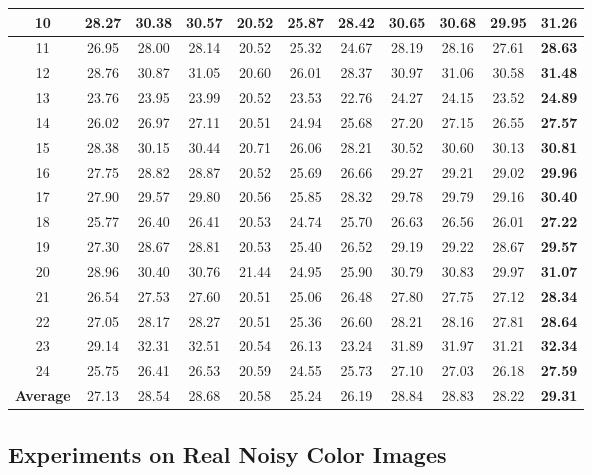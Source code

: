 \documentclass[10pt,twocolumn,letterpaper]{article}
\begin{document}
\begin{table}
\begin{center}
\begin{tabular}{|c||c|c|c|c|c|c|c|c|c|c|}
\hline
10& 28.27 & 30.38 & 30.57 & 20.52 & 25.87 & 28.42 & 30.65 & 30.68 & 29.95 & \textbf{31.26}
\\
\hline
11& 26.95 & 28.00 & 28.14 & 20.52 & 25.32 & 24.67 & 28.19 & 28.16 & 27.61 & \textbf{28.63}
\\
\hline
12& 28.76 & 30.87 & 31.05 & 20.60 & 26.01 & 28.37 & 30.97 & 31.06 & 30.58 & \textbf{31.48}
\\
\hline
13& 23.76 & 23.95 & 23.99 & 20.52 & 23.53 & 22.76 & 24.27 & 24.15 & 23.52 & \textbf{24.89}
\\
\hline
14& 26.02 & 26.97 & 27.11 & 20.51 & 24.94  & 25.68 & 27.20 & 27.15 & 26.55 & \textbf{27.57}
\\
\hline
15& 28.38 & 30.15 & 30.44 & 20.71 & 26.06 & 28.21 & 30.52 & 30.60 & 30.13 & \textbf{30.81}
\\
\hline
16& 27.75 & 28.82 & 28.87 & 20.52 & 25.69 & 26.66 & 29.27 & 29.21 & 29.02 & \textbf{29.96}
\\
\hline
17& 27.90 & 29.57 & 29.80 & 20.56 & 25.85 & 28.32 & 29.78 & 29.79 & 29.16 & \textbf{30.40}
\\
\hline
18& 25.77 & 26.40 & 26.41 & 20.53 & 24.74 & 25.70 & 26.63 & 26.56 & 26.01 & \textbf{27.22}
\\
\hline
19& 27.30 & 28.67 & 28.81 & 20.53 & 25.40 & 26.52 & 29.19 & 29.22 & 28.67 & \textbf{29.57}
\\
\hline
20& 28.96 & 30.40 & 30.76 & 21.44 & 24.95 & 25.90 & 30.79 & 30.83 & 29.97 & \textbf{31.07}
\\
\hline
21& 26.54 & 27.53 & 27.60 & 20.51 & 25.06 & 26.48 & 27.80 & 27.75 & 27.12 & \textbf{28.34}
\\
\hline
22& 27.05 & 28.17 & 28.27 & 20.51 & 25.36 & 26.60 & 28.21 & 28.16 & 27.81 & \textbf{28.64}
\\
\hline
23& 29.14 & 32.31 & 32.51 & 20.54 & 26.13 & 23.24 & 31.89 & 31.97 & 31.21 & \textbf{32.34}
\\
\hline
24& 25.75 & 26.41 & 26.53 & 20.59 & 24.55 & 25.73 & 27.10 & 27.03 & 26.18 & \textbf{27.59}
\\
\hline
\textbf{Average} 
& 27.13 & 28.54 & 28.68 & 20.58 & 25.24 & 26.19 & 28.84 & 28.83 & 28.22 & \textbf{29.31}
\\
\hline
\end{tabular}
\end{center}
\vspace{-1mm}
\end{table}

\vspace{-1mm}
\subsection{Experiments on Real Noisy Color Images}
\vspace{-1mm}
\end{document}
